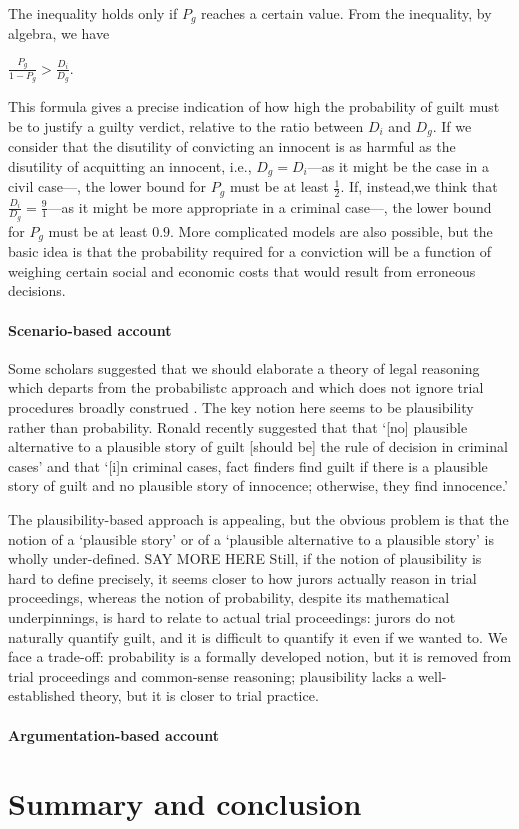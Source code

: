 \documentclass[10pt]{article}
\begin{document}
The inequality holds only if $P_g$ reaches a certain value. 
From the inequality, by algebra, we have

\vspace{2mm}
$\frac{P_g}{1- P_g} > \frac{D_i}{D_g}$.

\vspace{2mm}
\noindent
This formula gives a precise indication of how high the probability 
of guilt must be to justify a guilty verdict, relative to the ratio between $D_i$ and $D_g$. If we consider that
the disutility of convicting an innocent is as harmful as the disutility of acquitting an innocent, 
i.e., $D_g=D_i$---as it might be the case in a civil case---, the lower bound for $P_g$ must be at least $\frac{1} {2}$. 
If, instead,we think that $\frac{D_i}{D_g}=\frac{9}{1}$---as it might be more appropriate in a criminal 
case---, the lower bound for $P_g$ must be at least $0.9$. More complicated models are also possible, 
but the basic idea is that the probability required for a conviction will be a function of weighing certain social and 
economic costs that would result from erroneous decisions. 



\paragraph{Scenario-based account}


Some scholars suggested that we should elaborate a 
theory of legal reasoning which departs from the 
probabilistc approach and which does not ignore trial procedures broadly construed
\citep{cohen77, nesson79, Thomson86, Walton2002, Stein05, Pardo2008Judicial-Proof-, ho08, Haack2011Legal-Probabili}.
The key notion here seems to be plausibility rather than probability.
Ronald \cite{Allen2010No-Plausible-Al} recently suggested that that 
`[no] plausible alternative to a plausible story of guilt [should be] the rule of decision in criminal cases'
and that `[i]n criminal cases, fact finders find guilt if there is a plausible story of guilt and 
no plausible story of innocence; otherwise, they find innocence.'

The plausibility-based approach is appealing, but the obvious problem is that the notion of a `plausible story' or of a `plausible alternative to a plausible story' is wholly under-defined. 
SAY MORE HERE
Still, if the notion of plausibility is hard to define precisely, it seems closer to how jurors actually reason in trial proceedings, whereas the notion of probability, despite its 
mathematical underpinnings, is hard to relate to actual trial proceedings: jurors do not naturally quantify guilt, and it is difficult to quantify it 
even if we wanted to. We face a trade-off: probability is a formally developed notion, but it is 
removed from trial proceedings and common-sense reasoning; plausibility 
lacks a well-established theory, but it is closer to trial practice. 


\paragraph{Argumentation-based account}


\section{Summary and conclusion}

%
	

\end{document}
